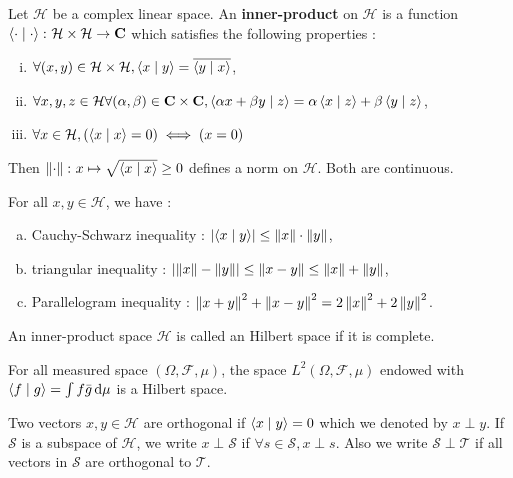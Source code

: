 \begin{defn}
	Let $\mathcal{H}$ be a complex linear space.
	An \textbf{inner-product} on $\mathcal{H}$ is a function $\left\langle \cdot \mid \cdot \right\rangle \colon \mathcal{H} \times \mathcal{H} \to \mathbf{C}$ which satisfies the following properties :
	\begin{enumerate}[(i)]
		\item $\forall (x,y) \in \mathcal{H} \times \mathcal{H}, \left\langle x \mid y \right\rangle = \overline{\left\langle y \mid x \right\rangle}$,
		\item $\forall x, y, z \in \mathcal{H} \forall (\alpha,\beta) \in \mathbf{C} \times \mathbf{C}, \left\langle \alpha x + \beta y \mid z \right\rangle = \alpha \left\langle x \mid z \right\rangle + \beta \left\langle y \mid z \right\rangle$,
		\item $\forall x \in \mathcal{H}, \left( \left\langle x \mid x \right\rangle = 0 \right) \iff \left( x = 0 \right)$
	\end{enumerate}
	Then $\left\lVert\cdot\right\rVert \colon x \mapsto \sqrt{\left\langle x \mid x \right\rangle} \geq 0$ defines a norm on $\mathcal{H}$.
	Both are continuous.
\end{defn}

\begin{thm}
	For all $x, y \in \mathcal{H}$, we have :
	\begin{enumerate}[a)]
		\item Cauchy-Schwarz inequality : $\left\lvert\left\langle x \mid y \right\rangle\right\rvert \leq \left\lVert x\right\rVert \cdot \left\lVert y\right\rVert$,
		\item triangular inequality : $\left\lvert\left\lVert x\right\rVert - \left\lVert y\right\rVert\right\rvert \leq \left\lVert x - y\right\rVert \leq \left\lVert x\right\rVert + \left\lVert y\right\rVert$,
		\item Parallelogram inequality : $\left\lVert x + y\right\rVert^2 + \left\lVert x - y\right\rVert^2 = 2 \left\lVert x\right\rVert^2 + 2 \left\lVert y\right\rVert^2$.
	\end{enumerate}
\end{thm}

\begin{defn}
	An inner-product space $\mathcal{H}$ is called an Hilbert space if it is complete.
\end{defn}

\begin{pop}
	For all measured space $(\Omega, \mathcal{F}, \mu)$, the space $L^2(\Omega, \mathcal{F}, \mu)$ endowed with $\left\langle f \mid g \right\rangle = \int f \bar{g} \mathop{}\mathopen{}\mathrm{d} \mu$ is a Hilbert space.
\end{pop}

\begin{defn}
	Two vectors $x,y \in \mathcal{H}$ are orthogonal if $\left\langle x \mid y \right\rangle = 0$ which we denoted by $x \perp y$.
	If $\mathcal{S}$ is a subspace of $\mathcal{H}$, we write $x \perp \mathcal{S}$ if $\forall s \in \mathcal{S}, x \perp s$.
	Also we write $\mathcal{S} \perp \mathcal{T}$ if all vectors in $\mathcal{S}$ are orthogonal to $\mathcal{T}$.
\end{defn}

